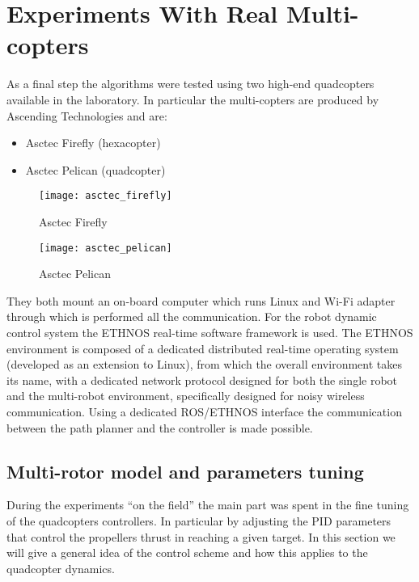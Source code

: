 \chapter{Experiments With Real Multi-copters}

As a final step the algorithms were tested using two high-end quadcopters available in the laboratory. In particular the multi-copters are produced by Ascending Technologies and are:
\begin{itemize}
\item Asctec Firefly (hexacopter)
\item Asctec Pelican (quadcopter)
\end{itemize}

\begin{figure}[H] 
  \begin{minipage}[b]{0.5\linewidth}
    \centering
    \texttt{[image: asctec\_firefly]}
    \caption{Asctec Firefly}
    \label{fig:firefly}
    \vspace{4ex}
  \end{minipage}
  \begin{minipage}[b]{0.5\linewidth}
    \centering
    \texttt{[image: asctec\_pelican]}
    \caption{Asctec Pelican}
    \label{fig:pelican}
    \vspace{4ex}%
  \end{minipage}
\end{figure}


They both mount an on-board computer which runs Linux and Wi-Fi adapter through which is performed all the communication. For the robot dynamic control system the ETHNOS \cite{ethnos2000} real-time software framework is used. The ETHNOS environment is composed of a dedicated distributed real-time operating system (developed as an extension to Linux), from which the overall environment takes its name, with a dedicated network protocol designed for both the single robot and the multi-robot environment, specifically designed for noisy wireless communication. Using a dedicated ROS/ETHNOS interface the communication between the path planner and the controller is made possible.


\section{Multi-rotor model and parameters tuning}


During the experiments ``on the field'' the main part was spent in the fine tuning of the quadcopters controllers. In particular by adjusting the PID parameters that control the propellers thrust in reaching a given target. In this section we will give a general idea of the control scheme and how this applies to the quadcopter dynamics.

